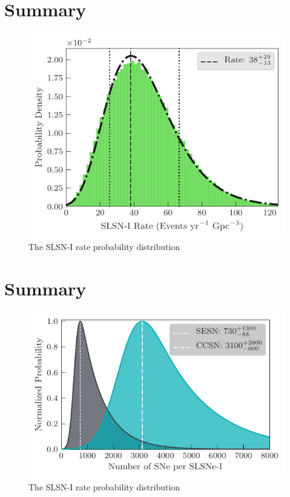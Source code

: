\documentclass[a4paper,fleqn,usenatbib]{mnras}
\begin{document}
\section{Summary}


\begin{figure}
	\includegraphics[width=\linewidth]{./SLSN_Rate_Dist.pdf}
    \caption{The SLSN-I rate probability distribution}
    \label{fig:SLSNrateProbDist}
\end{figure}



\section{Summary}


\begin{figure}
	\includegraphics[width=\linewidth]{./bothRateCompare.pdf}
    \caption{The SLSN-I rate probability distribution}
    \label{fig:compare2SLSN}
\end{figure}
\end{document}
